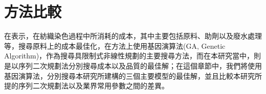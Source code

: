 \section{方法比較}
\label{c:ch6.3}
在\cite{Wu.etc}表示，在紡織染色過程中所消耗的成本，其中主要包括原料、助劑以及廢水處理等，搜尋原料上的成本最佳化，在方法上使用基因演算法(GA, Genetic Algorithm)，作為搜尋具限制式非線性規劃的主要搜尋方法，而在本研究當中，則是以序列二次規劃法分別搜尋成本以及品質的最佳解；在這個章節中，我們將使用基因演算法，分別搜尋本研究所建構的三個主要模型的最佳解，並且比較本研究所提的序列二次規劃法以及業界常用參數之間的差異。
